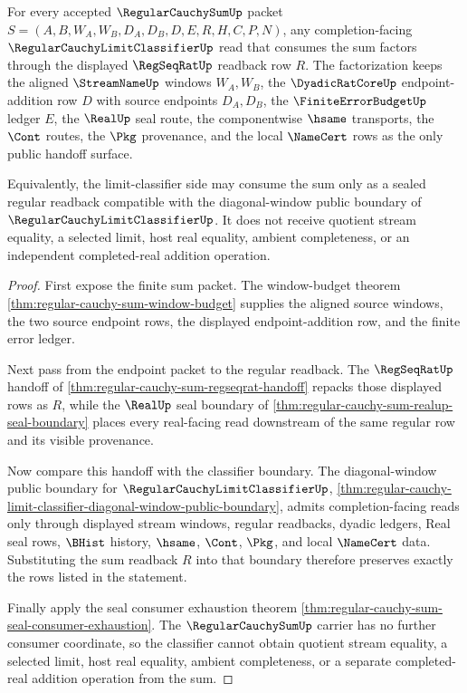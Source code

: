 \begin{theorem}
\label{thm:regular-cauchy-sum-limit-classifier-compatibility}
For every accepted $\RegularCauchySumUp$ packet $S=(A,B,W_A,W_B,D_A,D_B,D,E,R,H,C,P,N)$, any completion-facing $\RegularCauchyLimitClassifierUp$ read that consumes the sum factors through the displayed $\RegSeqRatUp$ readback row $R$. The factorization keeps the aligned $\StreamNameUp$ windows $W_A,W_B$, the $\DyadicRatCoreUp$ endpoint-addition row $D$ with source endpoints $D_A,D_B$, the $\FiniteErrorBudgetUp$ ledger $E$, the $\RealUp$ seal route, the componentwise $\hsame$ transports, the $\Cont$ routes, the $\Pkg$ provenance, and the local $\NameCert$ rows as the only public handoff surface.

Equivalently, the limit-classifier side may consume the sum only as a sealed regular readback compatible with the diagonal-window public boundary of $\RegularCauchyLimitClassifierUp$. It does not receive quotient stream equality, a selected limit, host real equality, ambient completeness, or an independent completed-real addition operation.
\end{theorem}
\begin{proof}
First expose the finite sum packet. The window-budget theorem \autoref{thm:regular-cauchy-sum-window-budget} supplies the aligned source windows, the two source endpoint rows, the displayed endpoint-addition row, and the finite error ledger.

Next pass from the endpoint packet to the regular readback. The $\RegSeqRatUp$ handoff of \autoref{thm:regular-cauchy-sum-regseqrat-handoff} repacks those displayed rows as $R$, while the $\RealUp$ seal boundary of \autoref{thm:regular-cauchy-sum-realup-seal-boundary} places every real-facing read downstream of the same regular row and its visible provenance.

Now compare this handoff with the classifier boundary. The diagonal-window public boundary for $\RegularCauchyLimitClassifierUp$, \autoref{thm:regular-cauchy-limit-classifier-diagonal-window-public-boundary}, admits completion-facing reads only through displayed stream windows, regular readbacks, dyadic ledgers, Real seal rows, $\BHist$ history, $\hsame$, $\Cont$, $\Pkg$, and local $\NameCert$ data. Substituting the sum readback $R$ into that boundary therefore preserves exactly the rows listed in the statement.

Finally apply the seal consumer exhaustion theorem \autoref{thm:regular-cauchy-sum-seal-consumer-exhaustion}. The $\RegularCauchySumUp$ carrier has no further consumer coordinate, so the classifier cannot obtain quotient stream equality, a selected limit, host real equality, ambient completeness, or a separate completed-real addition operation from the sum.
\end{proof}

